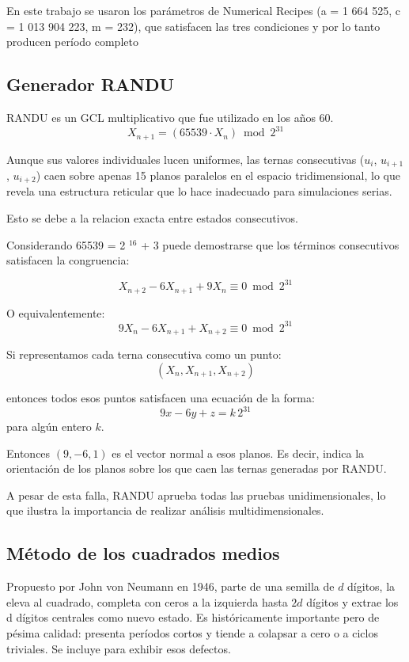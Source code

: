 \documentclass{article}
\begin{document}
En este trabajo se usaron los parámetros de Numerical Recipes (a = 1 664 525, c = 1 013 904 223, m = 232), que satisfacen las tres condiciones y por lo tanto producen período completo


\subsection{Generador RANDU}
RANDU es un GCL multiplicativo que fue utilizado en los años 60.
\begin{equation}
X_{n+1} = (65539 \cdot X_n) \bmod 2^{31}
\end{equation}

Aunque sus valores individuales lucen uniformes, las ternas consecutivas ($u_i$, $u_{i+1}$, $u_{i+2}$) caen sobre apenas 15 planos paralelos en el espacio tridimensional, lo que revela una estructura reticular que lo hace inadecuado para simulaciones serias. 

Esto se debe a la relacion exacta entre estados consecutivos.

Considerando 65539 = 2 $^{16}$ + 3 puede demostrarse que los términos consecutivos satisfacen la congruencia:

\begin{equation}
X_{n+2} - 6X_{n+1} + 9X_n \equiv 0 \bmod{2^{31}}
\end{equation}

O equivalentemente:
\begin{equation}
9X_n - 6X_{n+1} + X_{n+2} \equiv 0 \bmod{2^{31}}
\end{equation}

Si representamos cada terna consecutiva como un punto:
\begin{equation}
(X_n, X_{n+1}, X_{n+2})
\end{equation}

entonces todos esos puntos satisfacen una ecuación de la forma:
\begin{equation}
9x - 6y + z = k\,2^{31}
\end{equation}
para algún entero $k$.

Entonces $(9,-6,1)$ es el vector normal a esos planos. Es decir, indica la orientación de los planos sobre los que caen las ternas generadas por RANDU.


A pesar de esta falla, RANDU aprueba todas las pruebas unidimensionales, lo que ilustra la importancia de realizar análisis multidimensionales.


\subsection{Método de los cuadrados medios}
Propuesto por John von Neumann en 1946, parte de una semilla de $d$ dígitos, la eleva al cuadrado, completa con ceros a la izquierda hasta $2d$ dígitos y extrae los d dígitos centrales como nuevo estado. Es históricamente importante pero de pésima calidad: presenta períodos cortos y tiende a colapsar a cero o a ciclos triviales. Se incluye para exhibir esos defectos.
\end{document}
